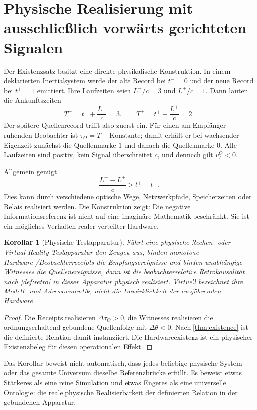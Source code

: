 \documentclass[11pt,a4paper]{article}
\newtheorem{korollar}{Korollar}[section]
\theoremstyle{remark}
\begin{document}
\section{Physische Realisierung mit ausschließlich vorwärts gerichteten Signalen}
\label{sec:physical}

Der Existenzsatz besitzt eine direkte physikalische Konstruktion. In einem
deklarierten Inertialsystem werde der alte Record bei \(t^-=0\) und der neue
Record bei \(t^+=1\) emittiert. Ihre Laufzeiten seien \(L^-/c=3\) und
\(L^+/c=1\). Dann lauten die Ankunftszeiten
\[
  T^-=t^-+\frac{L^-}{c}=3,
  \qquad
  T^+=t^++\frac{L^+}{c}=2.
\]
Der spätere Quellenrecord trifft also zuerst ein. Für einen am Empfänger
ruhenden Beobachter ist \(\tau_O=T+\text{Konstante}\); damit erhält er bei
wachsender Eigenzeit zunächst die Quellenmarke \(1\) und danach die
Quellenmarke \(0\). Alle Laufzeiten sind positiv, kein Signal überschreitet
\(c\), und dennoch gilt \(v_I^O<0\).

Allgemein genügt
\[
  \frac{L^- - L^+}{c}>t^+-t^-.
\]
Dies kann durch verschiedene optische Wege, Netzwerkpfade, Speicherzeiten
oder Relais realisiert werden. Die Konstruktion zeigt: Die negative
Informationsreferenz ist nicht auf eine imaginäre Mathematik beschränkt. Sie
ist ein mögliches Verhalten realer verteilter Hardware.

\begin{korollar}[Physische Testapparatur]
\label{cor:apparatus}
Führt eine physische Rechen- oder Virtual-Reality-Testapparatur den Zeugen aus,
binden monotone Hardware-/Beobachterreceipts die Empfangsereignisse und
binden unabhängige Witnesses die Quellenereignisse, dann ist die
beobachterrelative Retrokausalität nach \cref{def:retro} in dieser Apparatur
physisch realisiert. \emph{Virtuell} bezeichnet ihre Modell- und
Adresssemantik, nicht die Unwirklichkeit der ausführenden Hardware.
\end{korollar}

\begin{proof}
Die Receipts realisieren \(\Delta\tau_O>0\), die Witnesses realisieren die
ordnungserhaltend gebundene Quellenfolge mit \(\Delta\theta<0\). Nach
\cref{thm:existence} ist die definierte Relation damit instanziiert. Die
Hardwareexistenz ist ein physischer Existenzbeleg für diesen operationalen
Effekt.
\end{proof}

Das Korollar beweist nicht automatisch, dass jedes beliebige physische System
oder das gesamte Universum dieselbe Referenzbrücke erfüllt. Es beweist etwas
Stärkeres als eine reine Simulation und etwas Engeres als eine universelle
Ontologie: die reale physische Realisierbarkeit der definierten Relation in
der gebundenen Apparatur.
\end{document}
